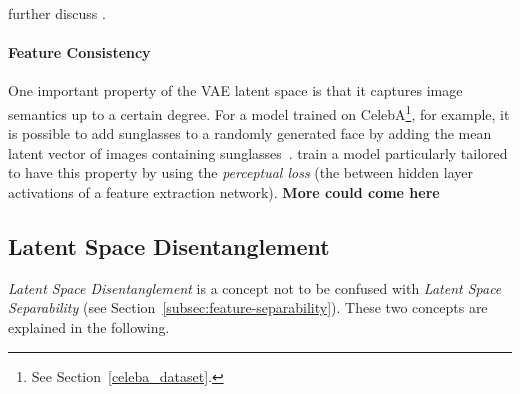 \citet{tschannen2018recent} further discuss .

\paragraph{Feature Consistency}

One important property of the \ac{VAE} latent space is that it captures image semantics up to a certain degree.
For a model trained on CelebA\footnote{See Section~\ref{celeba_dataset}.}, for example, it is possible to add sunglasses to a randomly generated face by adding the mean latent vector of images containing sunglasses~\citep{hou2017deep}.
\citet{hou2017deep} train a model particularly tailored to have this property by using the \textit{perceptual loss} (the between hidden layer activations of a feature extraction network).
\textbf{More could come here}

\subsection{Latent Space Disentanglement}\label{subsec:feature-disentanglement}
\textit{Latent Space Disentanglement} is a concept not to be confused with \textit{Latent Space Separability} (see Section~\ref{subsec:feature-separability}).
These two concepts are explained in the following.

